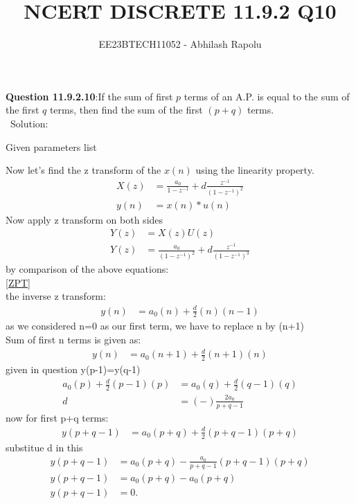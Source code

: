 \documentclass[journal,12pt,twocolumn]{IEEEtran}
\title{NCERT DISCRETE 11.9.2 Q10}
\author{EE23BTECH11052 - Abhilash Rapolu }
\begin{document}
\maketitle
\newpage
\textbf{Question 11.9.2.10}:If the sum of first $p$ terms of an A.P. is equal to the sum of the first $q$ terms, then
find the sum of the first $(p + q)$ terms.\\
\ Solution:
\begin{table}[htbp]
\centering

\caption{Given parameters list}
\end{table}
Now let's find the z transform of the $x(n)$ using the linearity property.\\
\begin{align}
X(z)&=\frac{a_0}{1-z^{-1}}+d\frac{z^{-1}}{(1-z^{-1})^2}\\
y(n) &= x(n)*u(n)
\end{align}
Now apply z transform on both sides\\
\begin{align}
Y(z)&=X(z)U(z)\\
Y(z)&=\frac{a_0}{(1-z^{-1})^2}+d\frac{z^{-1}}{(1-z^{-1})^3}
\end{align}
by comparison of the above equations:\\
\eqref{ZPT}\\
the inverse z transform:\\
\begin{align}
y(n)&=a_0(n)+\frac{d}{2}(n)(n-1)
\end{align}
as we considered n=0 as our first term, we have to replace n by (n+1)\\
Sum of first n terms is given as:\\
\begin{align}
y(n)&=a_0(n+1)+\frac{d}{2}(n+1)(n)
\end{align}
given in question y(p-1)=y(q-1)\\
\begin{align}
a_0(p)+\frac{d}{2}(p-1)(p)&=a_0(q)+\frac{d}{2}(q-1)(q)\\
d&=(-)\frac{2a_0}{p+q-1}
\end{align}
now for first p+q terms:\\
\begin{align}
y(p+q-1)&=a_0(p+q)+\frac{d}{2}(p+q-1)(p+q)
\end{align}
substitue d in this\\
\begin{align}
y(p+q-1)&=a_0(p+q)-\frac{a_0}{p+q-1}(p+q-1)(p+q)\\
y(p+q-1)&=a_0(p+q)-a_0(p+q)\\
y(p+q-1)&=0.
\end{align}
\end{document}
